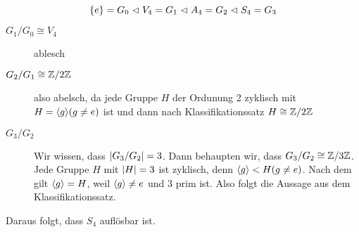 \documentclass[12pt,a4paper]{scrartcl}
\begin{document}
\begin{bsp}
\begin{enumerate}
		\begin{equation*}
			\left\lbrace e\right\rbrace = G_0 \vartriangleleft V_4 = G_1 \vartriangleleft A_4 = G_2 \vartriangleleft S_4 = G_3
		\end{equation*}
		\begin{description}
			\item[$G_1/G_0 \cong V_4$] ablesch
			\item[$G_2/G_1 \cong \mathbb Z/2\mathbb Z$] also abelsch, da jede Gruppe $H$ der Ordunung 2 zyklisch mit $H = \langle g\rangle (g \neq e)$ ist und dann nach Klassifikationssatz $H \cong \mathbb Z/2\mathbb Z$
			\item[$G_3/G_2$] Wir wissen, dass $\lvert G_3/G_2\rvert = 3$. Dann behaupten wir, dass $G_3/G_2 \cong \mathbb Z/3\mathbb Z$. Jede Gruppe $H$ mit $\lvert H\rvert = 3$ ist zyklisch, denn $\langle g\rangle < H (g \neq e)$. Nach dem  gilt $\langle g\rangle = H$, weil $\langle g\rangle \neq e$ und 3 prim ist. Also folgt die Aussage aus dem Klassifikationssatz.
		\end{description}
		Daraus folgt, dass $S_4$ auflösbar ist.
	\end{enumerate}
\end{bsp}
\end{document}
